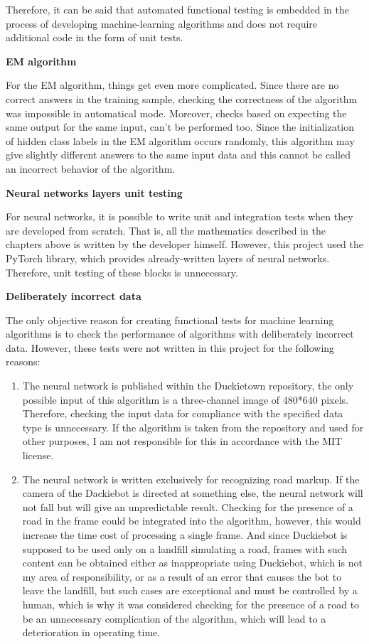 Therefore, it can be said that automated functional testing is embedded in the process of developing machine-learning algorithms and does not require additional code 
in the form of unit tests.

\textbf{EM algorithm}

For the EM algorithm, things get even more complicated. Since there are no correct answers in the training sample, checking the correctness of the algorithm was impossible in
automatical mode. Moreover, checks based on expecting the same output for the same input, can't be performed too. Since the initialization of hidden class labels in 
the EM algorithm occurs randomly, this algorithm may give slightly different answers to the same input data and this cannot be called
an incorrect behavior of the algorithm.

\textbf{Neural networks layers unit testing}

For neural networks, it is possible to write unit and integration tests when they are developed from scratch. That is, all the mathematics described in the chapters 
above is written by the developer himself. However, this project used the PyTorch library, which provides already-written layers of neural networks. 
Therefore, unit testing of these blocks is unnecessary.

\textbf{Deliberately incorrect data}

The only objective reason for creating functional tests for machine learning algorithms is to check the performance of algorithms with deliberately
incorrect data. However, these tests were not written in this project for the following reasons:
\begin{enumerate}
    \item The neural network is published within the Duckietown repository, the only possible input of this algorithm is a three-channel image of 480*640 pixels. 
    Therefore, checking the input data for compliance with the specified data type is unnecessary. If the algorithm is taken from the repository and used for other 
    purposes, I am not responsible for this in accordance with the MIT license.
    \item The neural network is written exclusively for recognizing road markup. If the camera of the Dackiebot is directed at something else, the neural network will not 
    fall but will give an unpredictable result. Checking for the presence of a road in the frame could be integrated into the algorithm, however, this would increase 
    the time cost of processing a single frame. And since Duckiebot is supposed to be used only on a landfill simulating a road, frames with such content can be obtained 
    either as inappropriate using Duckiebot, which is not my area of responsibility, or as a result of an error that causes the bot to leave the landfill, but such cases
    are exceptional and must be controlled by a human, which is why it was considered checking for the presence of a road to be an unnecessary complication of the algorithm, 
    which will lead to a deterioration in operating time.
\end{enumerate}

